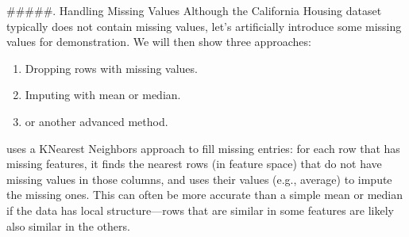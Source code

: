 \documentclass[letterpaper,10pt,english]{jupyterBook}
\begin{document}
\sphinxAtStartPar
\#\#\#\#\#. Handling Missing Values
Although the California Housing dataset typically does not contain missing values, let’s artificially introduce some missing values for demonstration. We will then show three approaches:
\begin{enumerate}
%
\item {} 
\sphinxAtStartPar
Dropping rows with missing values.

\item {} 
\sphinxAtStartPar
Imputing with mean or median.

\item {} 
\sphinxAtStartPar
{} or another advanced method.

\end{enumerate}

\sphinxAtStartPar
{}
 uses a K\sphinxhyphen{}Nearest Neighbors approach to fill missing entries: for each row that has missing features, it finds the nearest  rows (in feature space) that do not have missing values in those columns, and uses their values (e.g., average) to impute the missing ones. This can often be more accurate than a simple mean or median if the data has local structure—rows that are similar in some features are likely also similar in the others.
\end{document}
